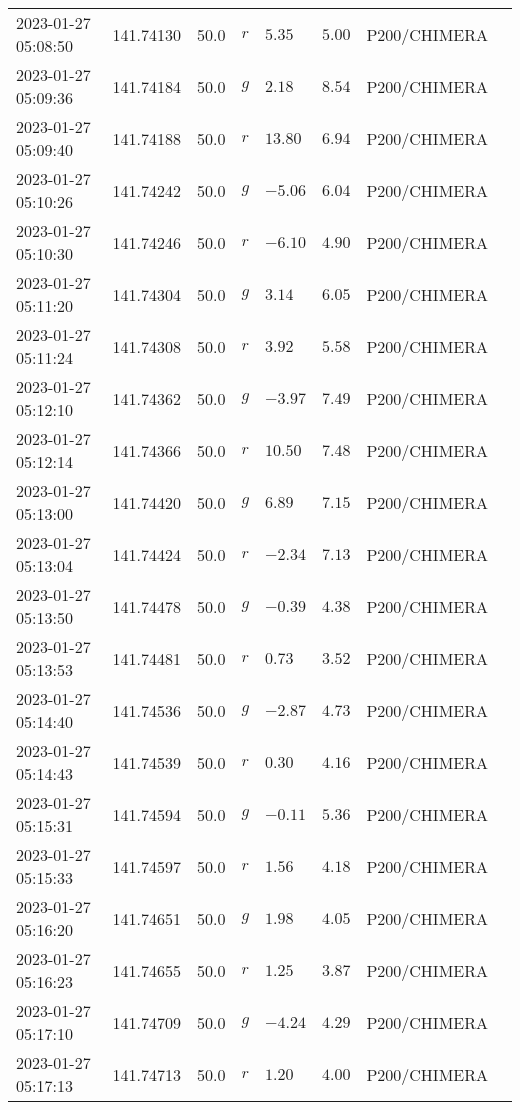 \documentclass{nature_plusfigure}
\begin{document}
\begin{supplement}
\begin{center}
\begin{longtable}{llllllll}
2023-01-27 05:08:50 & 141.74130 & 50.0 & $r$ & $5.35$ & $5.00$ & P200/CHIMERA &  \\ 
2023-01-27 05:09:36 & 141.74184 & 50.0 & $g$ & $2.18$ & $8.54$ & P200/CHIMERA &  \\ 
2023-01-27 05:09:40 & 141.74188 & 50.0 & $r$ & $13.80$ & $6.94$ & P200/CHIMERA &  \\ 
2023-01-27 05:10:26 & 141.74242 & 50.0 & $g$ & $-5.06$ & $6.04$ & P200/CHIMERA &  \\ 
2023-01-27 05:10:30 & 141.74246 & 50.0 & $r$ & $-6.10$ & $4.90$ & P200/CHIMERA &  \\ 
2023-01-27 05:11:20 & 141.74304 & 50.0 & $g$ & $3.14$ & $6.05$ & P200/CHIMERA &  \\ 
2023-01-27 05:11:24 & 141.74308 & 50.0 & $r$ & $3.92$ & $5.58$ & P200/CHIMERA &  \\ 
2023-01-27 05:12:10 & 141.74362 & 50.0 & $g$ & $-3.97$ & $7.49$ & P200/CHIMERA &  \\ 
2023-01-27 05:12:14 & 141.74366 & 50.0 & $r$ & $10.50$ & $7.48$ & P200/CHIMERA &  \\ 
2023-01-27 05:13:00 & 141.74420 & 50.0 & $g$ & $6.89$ & $7.15$ & P200/CHIMERA &  \\ 
2023-01-27 05:13:04 & 141.74424 & 50.0 & $r$ & $-2.34$ & $7.13$ & P200/CHIMERA &  \\ 
2023-01-27 05:13:50 & 141.74478 & 50.0 & $g$ & $-0.39$ & $4.38$ & P200/CHIMERA &  \\ 
2023-01-27 05:13:53 & 141.74481 & 50.0 & $r$ & $0.73$ & $3.52$ & P200/CHIMERA &  \\ 
2023-01-27 05:14:40 & 141.74536 & 50.0 & $g$ & $-2.87$ & $4.73$ & P200/CHIMERA &  \\ 
2023-01-27 05:14:43 & 141.74539 & 50.0 & $r$ & $0.30$ & $4.16$ & P200/CHIMERA &  \\ 
2023-01-27 05:15:31 & 141.74594 & 50.0 & $g$ & $-0.11$ & $5.36$ & P200/CHIMERA &  \\ 
2023-01-27 05:15:33 & 141.74597 & 50.0 & $r$ & $1.56$ & $4.18$ & P200/CHIMERA &  \\ 
2023-01-27 05:16:20 & 141.74651 & 50.0 & $g$ & $1.98$ & $4.05$ & P200/CHIMERA &  \\ 
2023-01-27 05:16:23 & 141.74655 & 50.0 & $r$ & $1.25$ & $3.87$ & P200/CHIMERA &  \\ 
2023-01-27 05:17:10 & 141.74709 & 50.0 & $g$ & $-4.24$ & $4.29$ & P200/CHIMERA &  \\ 
2023-01-27 05:17:13 & 141.74713 & 50.0 & $r$ & $1.20$ & $4.00$ & P200/CHIMERA &  \\ 

\end{longtable}
\end{center}
\end{supplement}
\end{document}
